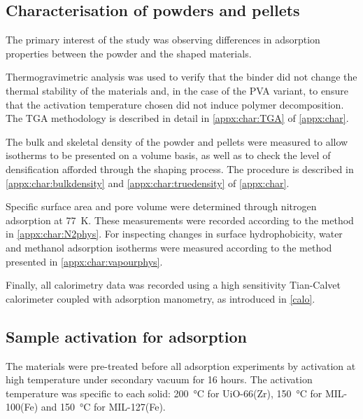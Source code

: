 \subsection{Characterisation of powders and pellets}

The primary interest of the study was observing differences
in adsorption properties between the powder and the shaped materials.

Thermogravimetric analysis was used to verify that the binder
did not change the thermal stability of the materials and, in the
case of the \gls{PVA} variant, to ensure that the activation temperature
chosen did not induce polymer decomposition. The \gls{TGA} methodology
is described in detail in \autoref{appx:char:TGA} of \autoref{appx:char}.

The bulk and skeletal density of the powder and pellets were measured
to allow isotherms to be presented on a volume basis, as well as
to check the level of densification afforded through the
shaping process. The procedure is described in \autoref{appx:char:bulkdensity}
and \autoref{appx:char:truedensity} of \autoref{appx:char}.

Specific surface area and pore volume were determined through
nitrogen adsorption at \SI{77}{\kelvin}. These measurements were
recorded according to the method in \autoref{appx:char:N2phys}.
For inspecting changes in surface hydrophobicity, water and
methanol adsorption isotherms were measured according to
the method presented in \autoref{appx:char:vapourphys}.

Finally, all calorimetry data was recorded using a high sensitivity
Tian-Calvet calorimeter coupled with adsorption manometry, as
introduced in \autoref{calo}.

\subsection{Sample activation for adsorption}

The materials were pre-treated before all adsorption experiments by
activation at high temperature under secondary vacuum for 16 hours.
The activation temperature was specific
to each solid: \SI{200}{\degreeCelsius} for UiO-66(Zr),
\SI{150}{\degreeCelsius} for MIL-100(Fe) and \SI{150}{\degreeCelsius}
for MIL-127(Fe).
